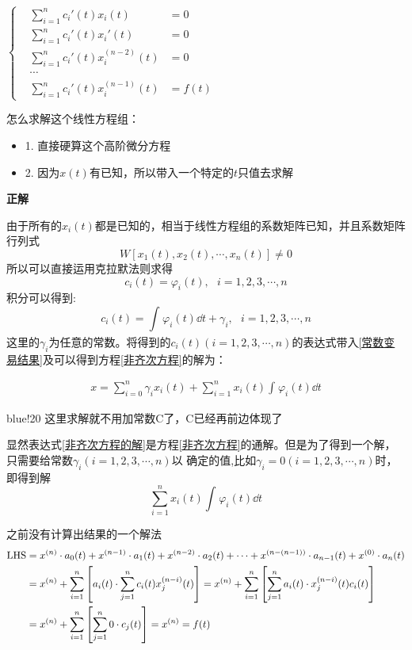 \begin{center}
$
\left\{
    \begin{aligned}
        &\sum_{i=1}^{n}{c_i'(t)x_i(t)} & = 0\\
        &\sum_{i=1}^{n}{c_i'(t)x_i'(t)} & = 0\\
        &\sum_{i=1}^{n}{c_i'(t)x_i^{(n-2)}(t)} & = 0\\
        &\cdots&\\
        &\sum_{i=1}^{n}{c_i'(t)x_i^{(n-1)}(t)} & = f(t)
    \end{aligned}
\right.
$    
\end{center}

怎么求解这个线性方程组：
\begin{itemize}
    \item 1. 直接硬算这个高阶微分方程
    \item 2. 因为$x(t)$有已知，所以带入一个特定的$t$只值去求解
\end{itemize}

\noindent\textbf{正解}\par
由于所有的$x_i(t)$都是已知的，相当于线性方程组的系数矩阵已知，并且系数矩阵行列式
\[
    W[x_1(t), x_2(t), \cdots, x_n(t)]\neq 0
\]
所以可以直接运用克拉默法则求得
\[
    c_i(t) = \varphi_i(t), ~~~ i = 1, 2, 3, \cdots, n
\]
积分可以得到:
\[
    c_i(t)= \int_{}^{}{\varphi_i(t) \dd t} + \gamma_i, ~~~ i = 1, 2, 3, \cdots, n
\]
这里的$\gamma_i$为任意的常数。将得到的$c_i(t)(i = 1, 2, 3, \cdots, n)$的表达式带入\ref{常数变易结果}及可以得到方程\ref{非齐次方程}的解为：

\begin{theorem}
    \begin{align}
        x = \sum_{i=0}^{n}{\gamma_i x_i(t)} + \sum_{i=1}^{n}{x_i(t)\int_{}^{}{\varphi_i(t) \dd t}}
        \label{非齐次方程的解}        
    \end{align}
\end{theorem}

\begin{formal}{blue!20}
    这里求解就不用加常数C了，C已经再前边体现了
\end{formal}
显然表达式\ref{非齐次方程的解}是方程\ref{非齐次方程}的通解。但是为了得到一个解，只需要给常数$\gamma_i(i = 1, 2, 3, \cdots, n)$以
确定的值,比如$\gamma_i =0(i = 1, 2, 3, \cdots, n)$时， 即得到解
\[
    \sum_{i=1}^{n}{x_i(t)\int_{}^{}{\varphi_i(t) \dd t}}
\]

之前没有计算出结果的一个解法
\begin{align*}
    {\rm LHS} & = x^{(n)}\cdot a_{0}(t) + x^{(n-1)}\cdot a_{1}(t) + x^{(n-2)}\cdot a_{2}(t) + \cdots + x^{(n-(n-1))}\cdot a_{n-1}(t) + x^{(0)}\cdot a_{n}(t)\\
    & = x^{(n)} + \sum_{i=1}^{n}{\left[a_i(t)\cdot \sum_{j=1}^{n}{c_i(t)x_j^{(n-i)}(t)}\right]}
      = x^{(n)} + \sum_{i=1}^{n}{\left[\sum_{j=1}^{n}{a_i(t)\cdot x_j^{(n-i)}(t) c_i(t)}\right]}\\
    & = x^{(n)} + \sum_{i=1}^{n}{\left[\sum_{j=1}^{n}{0\cdot c_j(t)}\right]}
      = x^{(n)}
      =f(t)
\end{align*}


